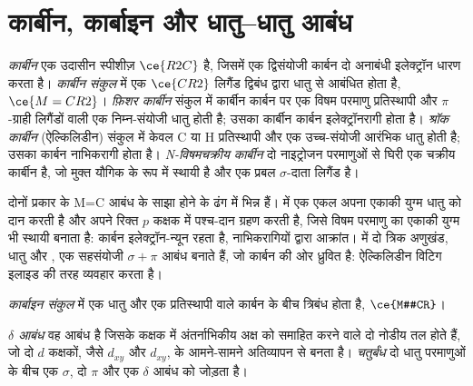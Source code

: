 \section{कार्बीन, कार्बाइन और धातु--धातु आबंध}

\begin{definition}[कार्बीन और कार्बीन संकुल]\label{def:b3:organometallic-bonding:carbene}
\emph{कार्बीन} एक उदासीन स्पीशीज़ $\ce{R2C}$ है, जिसमें एक द्विसंयोजी कार्बन
दो अनाबंधी इलेक्ट्रॉन धारण करता है। \emph{कार्बीन संकुल}
में एक $\ce{CR2}$ लिगैंड द्विबंध द्वारा धातु से आबंधित होता है, $\ce{M=CR2}$।
\emph{फ़िशर कार्बीन} संकुल में कार्बीन कार्बन पर एक विषम परमाणु प्रतिस्थापी
और $\pi$-ग्राही लिगैंडों वाली एक निम्न-संयोजी धातु होती है; उसका कार्बीन
कार्बन इलेक्ट्रॉनरागी होता है। \emph{श्रॉक कार्बीन} (ऐल्किलिडीन)
संकुल में केवल C या H प्रतिस्थापी और एक उच्च-संयोजी आरंभिक धातु होती है; उसका कार्बन
नाभिकरागी होता है। \emph{N-विषमचक्रीय कार्बीन} दो नाइट्रोजन परमाणुओं से
घिरी एक चक्रीय कार्बीन है, जो मुक्त यौगिक के रूप में स्थायी है और एक प्रबल
$\sigma$-दाता लिगैंड है।
\end{definition}

दोनों प्रकार के  M=C आबंध के साझा होने के ढंग में भिन्न हैं।
 में एक एकल  अपना एकाकी युग्म धातु को दान करती है और
अपने रिक्त $p$ कक्षक में पश्च-दान ग्रहण करती है, जिसे विषम परमाणु का एकाकी युग्म
भी स्थायी बनाता है: कार्बन इलेक्ट्रॉन-न्यून रहता है, नाभिकरागियों द्वारा आक्रांत।  में दो त्रिक अणुखंड, धातु और , एक सहसंयोजी $\sigma +
\pi$ आबंध बनाते हैं, जो कार्बन की ओर ध्रुवित है: ऐल्किलिडीन विटिग इलाइड की तरह व्यवहार करता है।

\begin{definition}[कार्बाइन संकुल]\label{def:b3:organometallic-bonding:carbyne}
\emph{कार्बाइन संकुल} में एक धातु
और एक प्रतिस्थापी वाले कार्बन के बीच त्रिबंध होता है, $\ce{M#CR}$।
\end{definition}

\begin{definition}[$\delta$ आबंध, चतुर्बंध]\label{def:b3:organometallic-bonding:delta}
\emph{$\delta$ आबंध} वह आबंध है जिसके कक्षक में अंतर्नाभिकीय अक्ष को
समाहित करने वाले दो नोडीय तल होते हैं, जो दो $d$
कक्षकों, जैसे $d_{xy}$ और $d_{xy}$, के आमने-सामने अतिव्यापन से बनता है। \emph{चतुर्बंध}
दो धातु परमाणुओं के बीच एक $\sigma$, दो $\pi$ और एक $\delta$ आबंध को जोड़ता है।
\end{definition}

